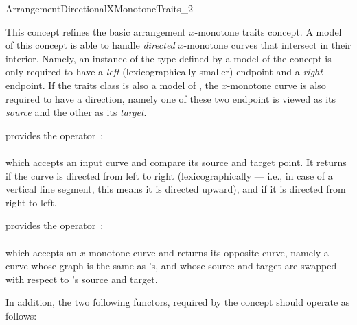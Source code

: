 
\ccRefPageBegin

\begin{ccRefConcept}{ArrangementDirectionalXMonotoneTraits_2}

\ccDefinition

This concept refines the basic arrangement $x$-monotone traits concept.
A model of this concept is able to handle \emph{directed} $x$-monotone curves
that intersect in their interior. Namely, an instance of the
 type defined by a model of the concept
 is only required to have a \emph{left}
(lexicographically smaller) endpoint and a \emph{right} endpoint.
If the traits class is also a model of
, the $x$-monotone curve is
also required to have a direction, namely one of these two endpoint is
viewed as its \emph{source} and the other as its \emph{target}.

\ccRefines
{}


\ccThreeToTwo

{provides the operator~: \\
  \\
 which accepts an input curve  and compare its source and target
 point. It returns  if the curve is directed from left to right
 (lexicographically --- i.e., in case of a vertical line segment, this means
 it is directed upward), and  if it is directed from right to
 left.}

{provides the operator~: \\
  \\
 which accepts an $x$-monotone curve  and returns its opposite curve,
 namely a curve whose graph is the same as 's, and whose source and
 target are swapped with respect to 's source and target.}

In addition, the two following functors, required by the concept
 should operate as follows:


\end{ccRefConcept}
